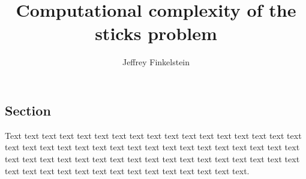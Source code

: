 \documentclass{lposter}
\title{Computational complexity of the sticks problem}
\author{Jeffrey Finkelstein}
\begin{document}
\begin{poster}

\section{Section}

Text text text text text text text text text text text text text
text text text text text text text text text text text text text
text text text text text text text text text text text text text
text text text text text text text text text text text text text
text text text text text text text text text text text text text.



\end{poster}



\end{document}
